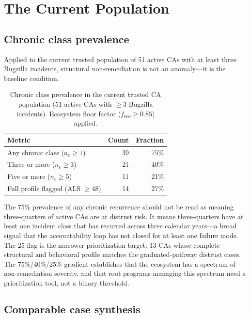 \documentclass[10pt,twocolumn,letterpaper]{article}
\begin{document}
\section{The Current Population}
\label{sec:population}

\subsection{Chronic class prevalence}

Applied to the current trusted population of 51 active CAs with at least three Bugzilla
incidents, structural non-remediation is not an anomaly---it is the baseline condition.

\begin{table}[t]
\centering
\footnotesize
\setlength{\tabcolsep}{4pt}
\caption{Chronic class prevalence in the current trusted CA population (51 active CAs
with $\geq$3 Bugzilla incidents). Ecosystem floor factor ($f_\text{eco} \geq 0.85$) applied.}
\label{tab:prevalence}
\begin{tabularx}{\columnwidth}{@{}Xrr@{}}
\toprule
Metric & Count & Fraction \\
\midrule
Any chronic class ($n_c \geq 1$)    & 39 & 75\% \\
Three or more ($n_c \geq 3$)        & 21 & 40\% \\
Five or more ($n_c \geq 5$)         & 11 & 21\% \\
Full profile flagged (ALS $\geq 48$) & 14 & 27\% \\
\bottomrule
\end{tabularx}
\end{table}

The 75\% prevalence of any chronic recurrence should not be read as meaning
three-quarters of active CAs are at distrust risk. It means three-quarters have at least
one incident class that has recurred across three calendar years---a broad signal that
the accountability loop has not closed for at least one failure mode. The 25%
flag is the narrower prioritization target: 13 CAs whose complete structural and behavioral
profile matches the graduated-pathway distrust cases. The 75\%/40\%/25\% gradient
establishes that the ecosystem has a spectrum of non-remediation severity, and that
root programs managing this spectrum need a prioritization tool, not a binary threshold.

\subsection{Comparable case synthesis}
\end{document}
